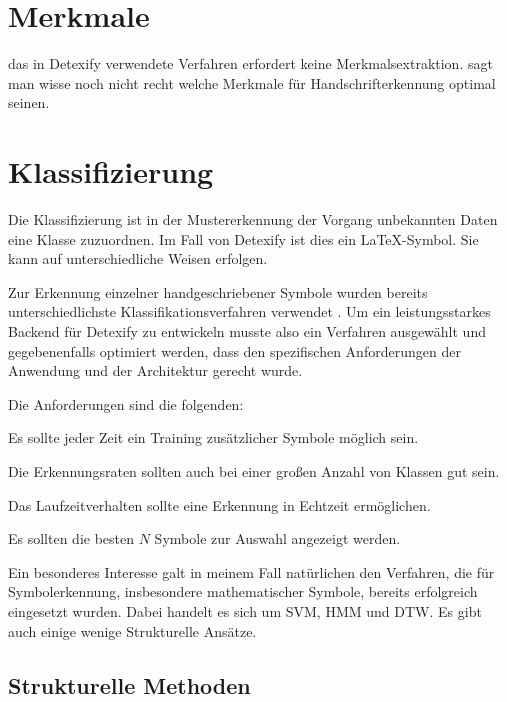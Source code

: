 \section{Merkmale} \label{sec:merkmale}

\TODO das in Detexify verwendete Verfahren erfordert keine Merkmalsextraktion.
\citet{Xie:2007p11427} sagt man wisse noch nicht recht welche Merkmale für Handschrifterkennung optimal seinen.


\section{Klassifizierung} 

\label{sec:klassifizierung}

Die Klassifizierung ist in der Mustererkennung der Vorgang unbekannten Daten eine Klasse zuzuordnen. Im Fall von Detexify ist dies ein \LaTeX-Symbol. Sie kann auf unterschiedliche Weisen erfolgen.

Zur Erkennung einzelner handgeschriebener Symbole wurden bereits unterschiedlichste Klassifikationsverfahren verwendet \cite{Plamondon:2000p10303}. Um ein leistungsstarkes Backend für Detexify zu entwickeln musste also ein Verfahren ausgewählt und gegebenenfalls optimiert werden, dass den spezifischen Anforderungen der Anwendung und der Architektur gerecht wurde.

Die Anforderungen sind die folgenden:
\begin{description}
  \label{desc:anforderungen} 
  \item[Adaptionsfähigkeit] Es sollte jeder Zeit ein Training zusätzlicher Symbole möglich sein. 
  \item[Skalierbarkeit] Die Erkennungsraten sollten auch bei einer großen Anzahl von Klassen gut sein. 
  \item[Laufzeitverhalten] Das Laufzeitverhalten sollte eine Erkennung in Echtzeit ermöglichen. 
  \item[Interaktivität] Es sollten die besten $N$ Symbole zur Auswahl angezeigt werden. 
\end{description}

Ein besonderes Interesse galt in meinem Fall natürlichen den Verfahren, die für Symbolerkennung, insbesondere mathematischer Symbole, bereits erfolgreich eingesetzt wurden. Dabei handelt es sich um \ac{SVM}, \ac{HMM} und \ac{DTW}. Es gibt auch einige wenige Strukturelle Ansätze.

\subsection{Strukturelle Methoden} \label{sub:strukturelle_methoden}

